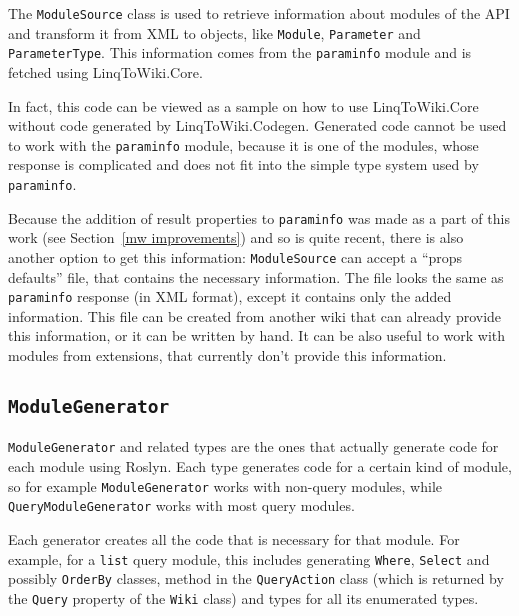 The \lstinline{ModuleSource} class is used to retrieve information about modules of the API
and transform it from XML to objects, like \lstinline{Module}, \lstinline{Parameter} and \lstinline{Parameter}\lstBreak\lstinline{Type}.
This information comes from the \texttt{paraminfo} module and is fetched using LinqToWiki.Core.

In fact, this code can be viewed as a sample on how to use LinqToWiki.Core
without code generated by LinqToWiki.Codegen.
Generated code cannot be used to work with the \texttt{paraminfo} module,
because it is one of the modules, whose response is complicated
and does not fit into the simple type system used by \texttt{paraminfo}.

Because the addition of result properties to \texttt{paraminfo} was made as a part of this work
(see Section~\ref{mw improvements}) and so is quite recent, there is also another option to get this information:
\lstinline{ModuleSource} can accept a “props defaults” file, that contains the necessary information.
The file looks the same as \texttt{paraminfo} response (in XML format),
except it contains only the added information.
This file can be created from another wiki that can already provide this information,
or it can be written by hand.
It can be also useful to work with modules from extensions, that currently don't provide this information.

\subsection{\texorpdfstring{\lstinline{ModuleGenerator}}{ModuleGenerator}}

\lstinline{ModuleGenerator} and related types are the ones that actually generate code for each module using Roslyn.
Each type generates code for a certain kind of module,
so for example \lstinline{ModuleGenerator} works with non-query modules,
while \lstinline{QueryModuleGenerator} works with most query modules.

Each generator creates all the code that is necessary for that module.
For example, for a \texttt{list} query module,
this includes generating \lstinline{Where}, \lstinline{Select} and possibly \lstinline{OrderBy} classes,
method in the \lstinline{QueryAction} class
(which is returned by the \lstinline{Query} property of the \lstinline{Wiki} class)
and types for all its enumerated types.